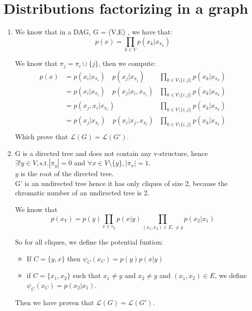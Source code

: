 \documentclass[a4paper,10pt]{article}
\begin{document}
\section{Distributions factorizing in a graph}
\begin{enumerate}
\item We know that in a DAG, G = (V,E) , we have that: 
\[ 
p(x) = \prod_{k \in V} p(x_k |x_{\pi_k})
\]

We know that $\pi_j = \pi_i \cup \{ j\}$, then we compute: 
\begin{align*}
p(x)  & = p(x_i|x_{\pi_i}) \quad p(x_j|x_{\pi_j})  & \prod_{k \in V \setminus \{i,j\}} p(x_k |x_{\pi_k}) \\
		& = p(x_i|x_{\pi_i}) \quad  p(x_j|x_i, x_{\pi_i}) &  \prod_{k \in V \setminus \{i,j\}} p(x_k |x_{\pi_k}) \\
		& =  p(x_j , x_i | x_{\pi_i}) &  \prod_{k \in V \setminus \{i,j\}} p(x_k |x_{\pi_k}) \\
		& =   p(x_j|x_{\pi_i}) \quad p(x_i|x_j, x_{\pi_i}) &  \prod_{k \in V \setminus \{i,j\}} p(x_k |x_{\pi_k}) \\
\end{align*}
Which prove that $\mathcal{L}(G) = \mathcal{L}(G')$.

\item G is a directed tree and does not contain any v-structure, hence \\$\exists ! y \in V, \text{s.t.} |\pi_y| = 0$ and $\forall x \in V \setminus \{ y\}, |\pi_x|  = 1$. \\$y$ is the root of the directed tree.\\
G' is an undirected tree hence it has only cliques of size 2, because the chromatic number of an undirected tree is 2. 

We know that 
\[ 
p(x_V) = p(y) \prod_{x \in v_y} p(x|y)  \prod_{(x_1,x_2) \in E , \neq y } p(x_2|x_1)  
\] 

So for all cliques, we define the potential funtion: 
\begin{itemize}
\item If $C = \{y,x\} $ then $\psi_C(x_C) = p(y) p(x|y)$ 
\item if $C = \{x_1,x_2\}$ such that $x_1 \neq y$ and $x_2 \neq y$ and $(x_1,x_2) \in E $, we define $\psi_C(x_C) =p(x_2 | x_1) $.  
\end{itemize}
Then we have proven that $\mathcal{L}(G) = \mathcal{L}(G')$.

\end{enumerate}
\end{document}

